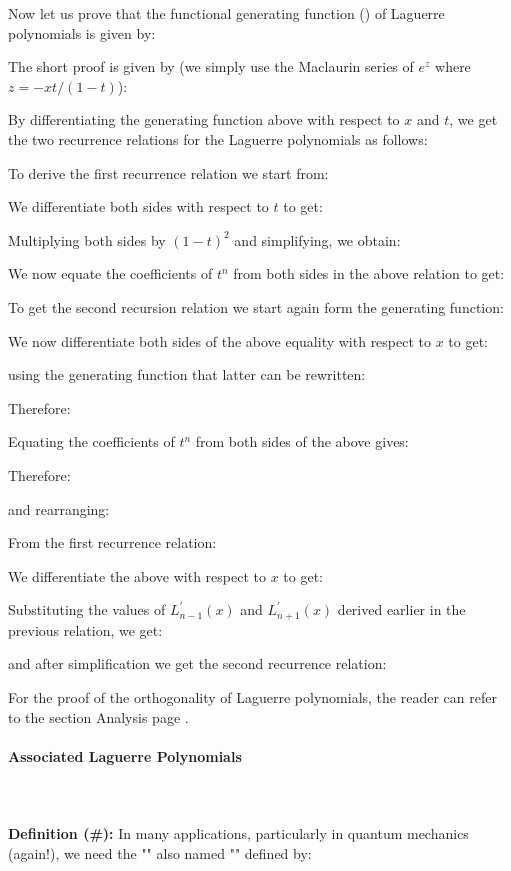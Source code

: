 	Now let us prove that the functional generating function () of Laguerre polynomials is given by:
	
	The short proof is given by (we simply use the Maclaurin series of $e^{z}$ where $z=-xt/(1-t)$):
	
	By differentiating the generating function above with respect to $x$ and $t$, we get the two recurrence relations for the Laguerre polynomials as follows:
	
	To derive the first recurrence relation we start from:
	
	We differentiate both sides with respect to $t$ to get:
	
	Multiplying both sides by $(1-t)^{2}$ and simplifying, we obtain:
	
	We now equate the coefficients of $t^{n}$ from both sides in the above relation to get:
	
	To get the second recursion relation we start again form the generating function:
	
	We now differentiate both sides of the above equality with respect to $x$ to get:
	
	using the generating function that latter can be rewritten:
	
	Therefore:
	
	Equating the coefficients of $t^{n}$ from both sides of the above gives:
	
	Therefore:
	
	and rearranging:
	
	From the first recurrence relation:
	
	We differentiate the above with respect to $x$ to get:
	
	Substituting the values of $L_{n-1}^{\prime}(x)$ and $L_{n+1}^{\prime}(x)$  derived earlier in the previous relation, we get:
	
	and after simplification we get the second recurrence relation:
	
	For the proof of the orthogonality of Laguerre polynomials, the reader can refer to the section Analysis page \pageref{orthogonality of Laguerre polynomial}.
		
	\paragraph{Associated Laguerre Polynomials}\label{Associated Laguerre polynomials}\mbox{}\\\\
	\textbf{Definition (\#\mydef):} In many applications, particularly in quantum mechanics (again!), we need the "" also named "" defined by:
	

